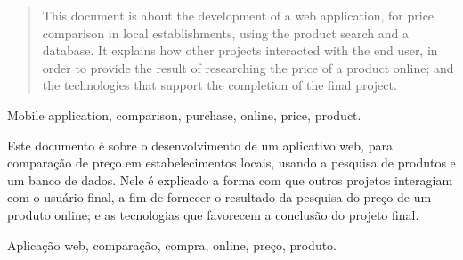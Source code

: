 \begin{abstract}
This document is about the development of a web application, for price comparison in local establishments, using the product search and a database. It explains how other projects interacted with the end user, in order to provide the result of researching the price of a product online; and the technologies that support the completion of the final project.
\end{abstract}

\begin{keywords}
Mobile application, comparison, purchase, online, price, product.
\end{keywords}

\begin{resumo}
Este documento é sobre o desenvolvimento de um aplicativo web, para comparação de preço em estabelecimentos locais, usando a pesquisa de produtos e um banco de dados. Nele é explicado a forma com que outros projetos interagiam com o usuário final, a fim de fornecer o resultado da pesquisa do preço de um produto online; e as tecnologias que favorecem a conclusão do projeto final.
\end{resumo}

\begin{palavrasChaves}
Aplicação web, comparação, compra, online, preço, produto.
\end{palavrasChaves}

